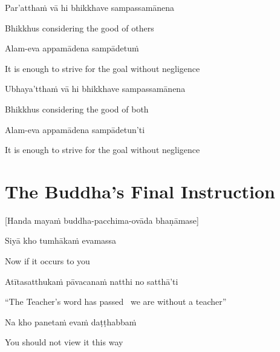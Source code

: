Par’atthaṁ vā hi bhikkhave sampassamānena

\begin{english}
  Bhikkhus considering the good of others
\end{english}

Alam-eva appamādena sampādetuṁ

\begin{english}
  It is enough to strive for the goal without negligence
\end{english}

Ubhaya’tthaṁ vā hi bhikkhave sampassamānena

\begin{english}
  Bhikkhus considering the good of both
\end{english}

Alam-eva appamādena sampādetun'ti

\begin{english}
  It is enough to strive for the goal without negligence
\end{english}

\suttaRef{[SN 12.22]}


\section{The Buddha's Final Instruction}
\label{buddhas-final-instruction}

\begin{center}
  [Handa mayaṁ buddha-pacchima-ovāda bhaṇāmase]
\end{center}

Siyā kho tumhākaṁ evamassa

\begin{english}
  Now if it occurs to you
\end{english}

Atītasatthukaṁ pāvacanaṁ natthi no satthā’ti

\begin{english}
  “The Teacher’s word has passed \breathmark\ we are without a teacher”
\end{english}

Na kho panetaṁ evaṁ daṭṭhabbaṁ

\begin{english}
  You should not view it this way
\end{english}

